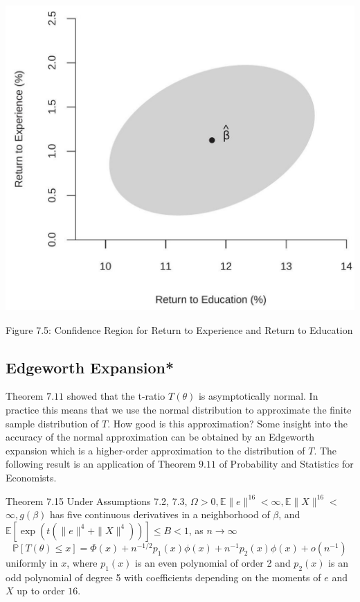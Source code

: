 \documentclass[10pt]{article}
\begin{document}
\includegraphics[max width=\textwidth]{2022_09_17_4fdd33cd9a12f3020189g-25}

Figure 7.5: Confidence Region for Return to Experience and Return to Education

\subsection{Edgeworth Expansion*}
Theorem $7.11$ showed that the t-ratio $T(\theta)$ is asymptotically normal. In practice this means that we use the normal distribution to approximate the finite sample distribution of $T$. How good is this approximation? Some insight into the accuracy of the normal approximation can be obtained by an Edgeworth expansion which is a higher-order approximation to the distribution of $T$. The following result is an application of Theorem $9.11$ of Probability and Statistics for Economists.

Theorem 7.15 Under Assumptions 7.2, 7.3, $\Omega>0, \mathbb{E}\|e\|^{16}<\infty, \mathbb{E}\|X\|^{16}<$ $\infty, g(\beta)$ has five continuous derivatives in a neighborhood of $\beta$, and $\mathbb{E}\left[\exp \left(t\left(\|e\|^{4}+\|X\|^{4}\right)\right)\right] \leq B<1$, as $n \rightarrow \infty$
$$
\mathbb{P}[T(\theta) \leq x]=\Phi(x)+n^{-1 / 2} p_{1}(x) \phi(x)+n^{-1} p_{2}(x) \phi(x)+o\left(n^{-1}\right)
$$
uniformly in $x$, where $p_{1}(x)$ is an even polynomial of order 2 and $p_{2}(x)$ is an odd polynomial of degree 5 with coefficients depending on the moments of $e$ and $X$ up to order $16 .$
\end{document}
